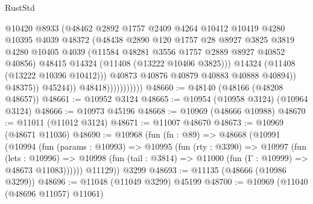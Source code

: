 \begin{lexlean}{RustStd}
\begin{coremodule}
                                      @10420
                                      @8933
                                      (@48462
                                        @2892
                                        @1757
                                        @2409
                                        @4264
                                        @10412
                                        @10419
                                        @4280
                                        @10395
                                        @4039
                                        @48372
                                        (@48438
                                          @2890
                                          @120
                                          @1757
                                          @28
                                          @8927
                                          @3825
                                          @3819
                                          @4280
                                          @10405
                                          @4039
                                          (@11584 @48281 @3556 @1757 @2889 @8927 @40852 @40856)
                                          @48415
                                          @14324
                                          (@11408 (@13222 @10406 @3825)))
                                        @14324
                                        (@11408 (@13222 @10396 @10412)))
                                      @40873
                                      @40876
                                      @40879
                                      @40883
                                      @40888
                                      @40894))
                                  @48375))
                              @45244))
                          @48418)))))))))))
@48660 := @48140 (@48166 (@48208 @48657))
@48661 := @10952 @3124
@48665 := @10954 (@10958 @3124) (@10964 @3124)
@48666 := @10973 @45196
@48668 := @10969 (@48666 @10988)
@48670 := @11011 (@11012 @3124)
@48671 := @11007 @48670
@48673 := @10969 (@48671 @11036)
@48690 := @10968
    (fun (fn : @89) =>
    @48668
      (@10991
        (@10994
          (fun (params : @10993) =>
          @10995
            (fun (rty : @3390) =>
            @10997
              (fun (lets : @10996) =>
              @10998 (fun (tail : @3814) => @11000 (fun (Γ : @10999) => @48673 @11083))))))
        @11129))
    @3299
@48693 := @11135 (@48666 (@10986 @3299))
@48696 := @11048 (@11049 @3299) @45199
@48700 := @10969 (@11040 (@48696 @11057) @11061)

\end{coremodule}
\end{lexlean}

